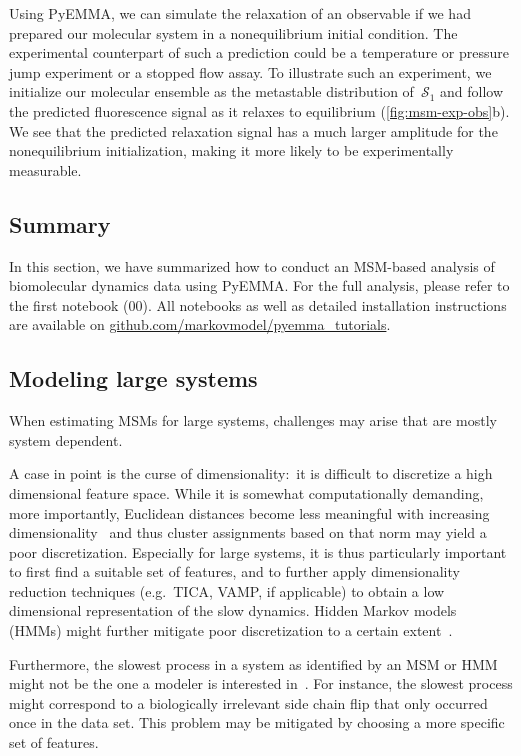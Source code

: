 \documentclass[9pt,tutorial]{livecoms}
\newcommand{\githubrepository}{\url{github.com/markovmodel/pyemma_tutorials}}
\begin{document}
Using PyEMMA, we can simulate the relaxation of an observable if we had prepared our molecular system in a nonequilibrium initial condition.
The experimental counterpart of such a prediction could be a temperature or pressure jump experiment or a stopped flow assay.
To illustrate such an experiment, we initialize our molecular ensemble as the metastable distribution of~$\mathcal{S}_1$ and follow the predicted fluorescence signal as it relaxes to equilibrium (\ref{fig:msm-exp-obs}b).
We see that the predicted relaxation signal has a much larger amplitude for the nonequilibrium initialization, making it more likely to be experimentally measurable.

\subsection{Summary}

In this section, we have summarized how to conduct an MSM-based analysis of biomolecular dynamics data using PyEMMA.
For the full analysis, please refer to the first notebook (00).
All notebooks as well as detailed installation instructions are available on \githubrepository{}.

\subsection{Modeling large systems}
When estimating MSMs for large systems, challenges may arise that are mostly system dependent.

A case in point is the curse of dimensionality:~it is difficult to discretize a high dimensional feature space. While it is somewhat computationally demanding, more importantly, Euclidean distances become less meaningful with increasing dimensionality~\cite{aggarwal_surprising_2001} and thus cluster assignments based on that norm may yield a poor discretization.
Especially for large systems, it is thus particularly important to first find a suitable set of features, and to further apply dimensionality reduction techniques (e.g.~TICA, VAMP, if applicable) to obtain a low dimensional representation of the slow dynamics.
Hidden Markov models (HMMs) might further mitigate poor discretization to a certain extent~\cite{noe-proj-hid-msm}.

Furthermore, the slowest process in a system as identified by an MSM or HMM might not be the one a modeler is interested in~\cite{banushkina_nonparametric_2015}.
For instance, the slowest process might correspond to a biologically irrelevant side chain flip that only occurred once in the data set.
This problem may be mitigated by choosing a more specific set of features.
\end{document}
